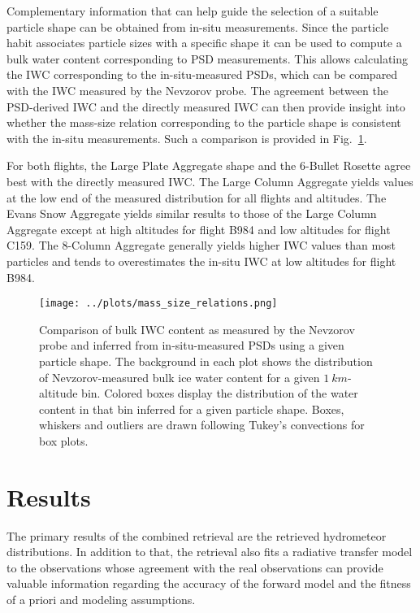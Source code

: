 \documentclass[journal abbreviation, manuscript]{copernicus}
\begin{document}
Complementary information that can help guide the selection of a suitable
particle shape can be obtained from in-situ measurements. Since the particle
habit associates particle sizes with a specific shape it can be used to compute
a bulk water content corresponding to PSD measurements. This allows calculating
the IWC corresponding to the in-situ-measured PSDs, which can be compared with
the IWC measured by the Nevzorov probe. The agreement between the PSD-derived
IWC and the directly measured IWC can then provide insight into whether the
mass-size relation corresponding to the particle shape is consistent with the
in-situ measurements. Such a comparison is provided in
Fig.~\ref{fig:mass_size_relation}.

For both flights, the Large Plate Aggregate shape and the 6-Bullet Rosette agree
best with the directly measured IWC. The Large Column Aggregate yields values at
the low end of the measured distribution for all flights and altitudes. The
Evans Snow Aggregate yields similar results to those of the Large Column
Aggregate except at high altitudes for flight B984 and low altitudes for
flight C159. The 8-Column Aggregate generally yields higher IWC values
than most particles and tends to overestimates the in-situ IWC at low
altitudes for flight B984.

\begin{figure}
  \centering
  \texttt{[image: ../plots/mass\_size\_relations.png]}
  \caption{ Comparison of bulk IWC content as measured by the Nevzorov probe and
    inferred from in-situ-measured PSDs using a given particle shape. The
    background in each plot shows the distribution of Nevzorov-measured bulk ice
    water content for a given $1\ \unit{km}$-altitude bin. Colored boxes display
    the distribution of the water content in that bin inferred for a given
    particle shape. Boxes, whiskers and outliers are drawn following Tukey's convections for box plots.}
  \label{fig:mass_size_relation}
\end{figure}


\section{Results}
\label{sec:results}

The primary results of the combined retrieval are the retrieved hydrometeor
distributions. In addition to that, the retrieval also fits a radiative transfer
model to the observations whose agreement with the real observations can provide
valuable information regarding the accuracy of the forward model and the fitness
of a priori and modeling assumptions.
\end{document}
